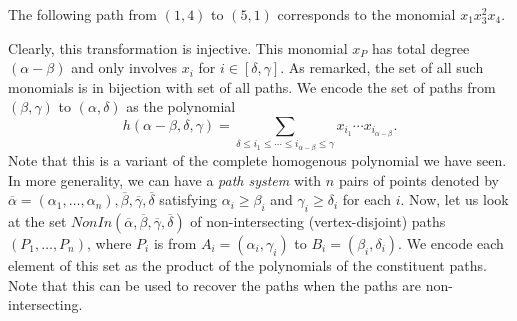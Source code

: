 	\begin{fex}
		The following path from $(1,4)$ to $(5,1)$ corresponds to the monomial $x_1x_3^2x_4$.
		\begin{center}
		\end{center}
	\end{fex}


	Clearly, this transformation is injective. This monomial $x_P$ has total degree $(\alpha - \beta)$ and only involves $x_i$ for $i \in [\delta,\gamma]$. As remarked, the set of all such monomials is in bijection with set of all paths. We encode the set of paths from $(\beta,\gamma)$ to $(\alpha,\delta)$ as the polynomial
	\[ h(\alpha-\beta,\delta,\gamma) = \sum_{\delta \le i_1 \le \cdots \le i_{\alpha-\beta} \le \gamma} x_{i_1} \cdots x_{i_{\alpha-\beta}}. \]
	Note that this is a variant of the complete homogenous polynomial we have seen.\\
	In more generality, we can have a \emph{path system} with $n$ pairs of points denoted by $\overline{\alpha} = (\alpha_1,\ldots,\alpha_n), \overline{\beta}, \overline{\gamma}, \overline{\delta}$ satisfying $\alpha_i \ge \beta_i$ and $\gamma_i \ge \delta_i$ for each $i$. Now, let us look at the set $NonIn(\overline{\alpha},\overline{\beta},\overline{\gamma},\overline{\delta})$ of non-intersecting (vertex-disjoint) paths $(P_1,\ldots,P_n)$, where $P_i$ is from $A_i = (\alpha_i,\gamma_i)$ to $B_i = (\beta_i,\delta_i)$. We encode each element of this set as the product of the polynomials of the constituent paths. Note that this can be used to recover the paths when the paths are non-intersecting.
	
